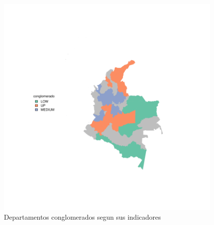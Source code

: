 \documentclass{article}
\begin{document}
\begin{figure}[h]
\centering
\begin{adjustbox}{width=12cm,height=12cm,clip,trim=0cm 0cm 0cm 0cm}
\includegraphics{paper_version1-plotMap1}
\end{adjustbox}
\caption{Departamentos conglomerados segun sus indicadores}\label{clustmap}
\end{figure}




\end{document}
